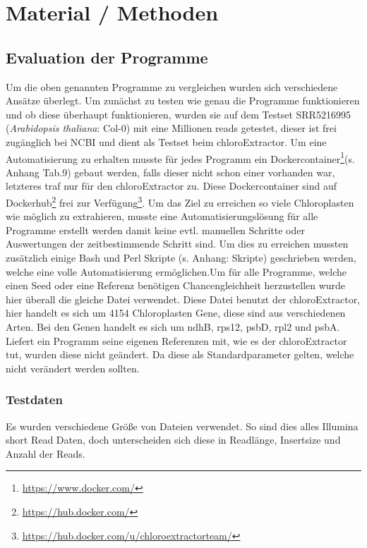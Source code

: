 \documentclass{scrartcl}
\begin{document}
\section{Material / Methoden}
\label{sec-3}
\subsection{Evaluation der Programme}
\label{sec-3-1}
Um die oben genannten Programme zu vergleichen wurden sich verschiedene Ansätze überlegt.
Um zunächst zu testen wie genau die Programme funktionieren und ob diese überhaupt funktionieren,
wurden sie auf dem Testset SRR5216995 (\emph{Arabidopsis thaliana}: Col-0) mit eine Millionen reads getestet, 
dieser ist frei zugänglich bei NCBI\footnotemark[36]{} und dient als Testset beim chloroExtractor\footnotemark[16]{}. Um eine 
Automatisierung zu erhalten musste für jedes Programm ein Dockercontainer\footnote{\url{https://www.docker.com/}}(s. Anhang Tab.9) gebaut werden, falls dieser nicht 
schon einer vorhanden war, letzteres traf nur für den chloroExtractor zu. Diese Dockercontainer sind auf Dockerhub\footnote{\url{https://hub.docker.com/}} frei
zur Verfügung\footnote{\url{https://hub.docker.com/u/chloroextractorteam/}}. Um das Ziel zu erreichen
so viele Chloroplasten wie möglich zu extrahieren, musste eine Automatisierungslösung für alle Programme
erstellt werden damit keine evtl. manuellen Schritte oder Auswertungen der zeitbestimmende Schritt sind.
Um dies zu erreichen mussten zusätzlich einige Bash und Perl Skripte (s. Anhang: Skripte) geschrieben werden, welche eine volle
Automatisierung ermöglichen.Um für alle Programme, welche einen Seed oder eine Referenz benötigen Chancengleichheit herzustellen wurde hier überall die gleiche Datei verwendet. 
Diese Datei benutzt der chloroExtractor, hier handelt es sich um 4154 Chloroplasten Gene, diese sind aus verschiedenen Arten. Bei den Genen handelt es sich um ndhB, rps12, psbD, rpl2 und psbA. 
Liefert ein Programm seine eigenen Referenzen mit, wie es der chloroExtractor tut, wurden diese nicht geändert. Da diese als Standardparameter gelten, welche nicht verändert werden sollten.   

\subsubsection{Testdaten}
\label{sec-3-1-1}
Es wurden verschiedene Größe von Dateien verwendet. So sind dies alles Illumina short Read Daten, doch unterscheiden sich diese in Readlänge, Insertsize und Anzahl der Reads.
\end{document}
